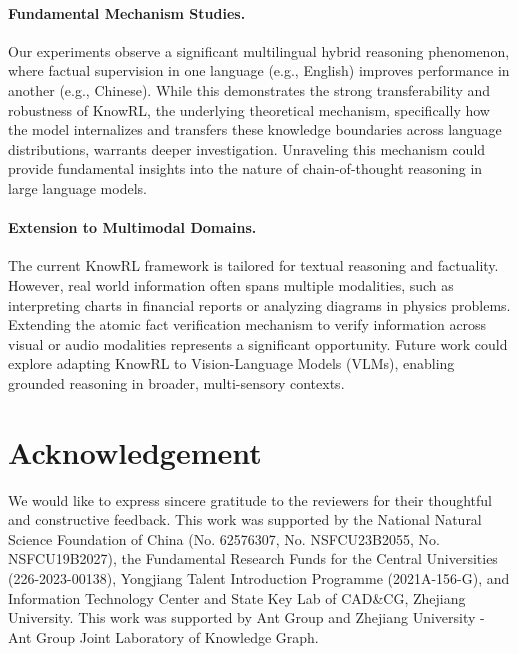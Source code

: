\paragraph{Fundamental Mechanism Studies.} Our experiments observe a significant multilingual hybrid reasoning phenomenon, where factual supervision in one language (e.g., English) improves performance in another (e.g., Chinese). While this demonstrates the strong transferability and robustness of KnowRL, the underlying theoretical mechanism, specifically how the model internalizes and transfers these knowledge boundaries across language distributions, warrants deeper investigation. Unraveling this mechanism could provide fundamental insights into the nature of chain-of-thought reasoning in large language models.

\paragraph{Extension to Multimodal Domains.} The current KnowRL framework is tailored for textual reasoning and factuality. However, real world information often spans multiple modalities, such as interpreting charts in financial reports or analyzing diagrams in physics problems. Extending the atomic fact verification mechanism to verify information across visual or audio modalities represents a significant opportunity. Future work could explore adapting KnowRL to Vision-Language Models (VLMs), enabling grounded reasoning in broader, multi-sensory contexts.


\section*{Acknowledgement}
We would like to express sincere gratitude to the  reviewers for their thoughtful and constructive feedback. This work was supported by the National Natural Science Foundation of China (No. 62576307, No. NSFCU23B2055, No. NSFCU19B2027), the Fundamental Research Funds for the Central Universities (226-2023-00138), Yongjiang Talent Introduction Programme (2021A-156-G), and Information Technology Center and State Key Lab of CAD\&CG, Zhejiang University. This work was supported by Ant Group and Zhejiang University - Ant Group Joint Laboratory of Knowledge Graph.

